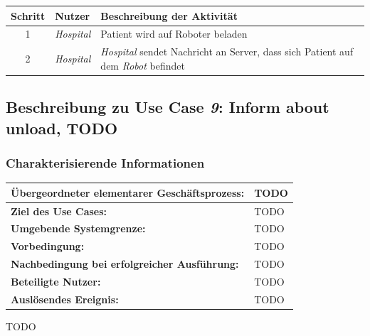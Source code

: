 			\begin{table}[H]
				\centering
				\begin{tabularx}{\textwidth}{|c|p{2cm}|X|}
				\hline
				Schritt & Nutzer & Beschreibung der Aktivität \\ \hline
				1 & \emph{Hospital} & Patient wird auf Roboter beladen \\
				2 & \emph{Hospital} & \emph{Hospital} sendet Nachricht an Server, dass sich Patient auf dem \emph{Robot} befindet \\
				\hline
				\end{tabularx}
			\end{table}


	\pagebreak
	
		\subsection{Beschreibung zu Use Case \emph{9}: Inform about unload, TODO}
			\subsubsection*{Charakterisierende Informationen}
			
			\begin{table}[H]
				\centering
				\begin{tabularx}{\textwidth}{|p{5cm}|X|}
					\hline
					\textbf{Übergeordneter elementarer Geschäftsprozess:} & TODO  \\ \hline
					\textbf{Ziel des Use Cases:} & TODO \\ \hline
					\textbf{Umgebende Systemgrenze:} & TODO \\ \hline
					\textbf{Vorbedingung:} & TODO \\ \hline
					\textbf{Nachbedingung bei erfolgreicher Ausführung:} & TODO \\ \hline
					\textbf{Beteiligte Nutzer:} & TODO \\ \hline
					\textbf{Auslösendes Ereignis:} & TODO \\
					\hline
				\end{tabularx}
			\end{table}
			
			TODO
			
			
